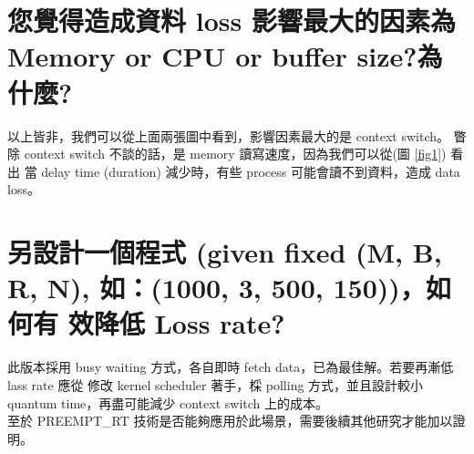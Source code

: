 \documentclass[a4paper, 12pt]{article}
\begin{document}
\begin{CJK*}{UTF8}{bsmi}
  \section{您覺得造成資料 loss 影響最大的因素為 Memory or CPU or buffer size?為什麼?}
  以上皆非，我們可以從上面兩張圖中看到，影響因素最大的是 context switch。
  瞥除 context switch 不談的話，是 memory 讀寫速度，因為我們可以從(圖 \ref{fig1}) 看出
  當 delay time (duration) 減少時，有些 process 可能會讀不到資料，造成 data loss。

  \section{另設計一個程式 (given fixed (M, B, R, N), 如：(1000, 3, 500, 150))，如何有
    效降低 Loss rate?}
  此版本採用 busy waiting 方式，各自即時 fetch data，已為最佳解。若要再漸低 lass rate 應從
  修改 kernel scheduler 著手，棌 polling 方式，並且設計較小 quantum time，再盡可能減少 context
  switch 上的成本。\\
  至於 PREEMPT\_RT 技術是否能夠應用於此場景，需要後續其他研究才能加以證明。

\end{CJK*}
\end{document}

